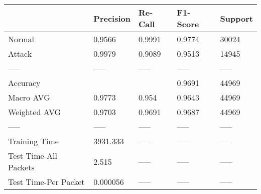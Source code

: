 \begin{tabular}{lllll}
\toprule
{} & Precision & Re-Call & F1-Score & Support \\
\midrule
Normal                &    0.9566 &  0.9991 &   0.9774 &   30024 \\
Attack                &    0.9979 &  0.9089 &   0.9513 &   14945 \\
-----                 &     ----- &   ----- &    ----- &   ----- \\
Accuracy              &           &         &   0.9691 &   44969 \\
Macro AVG             &    0.9773 &   0.954 &   0.9643 &   44969 \\
Weighted AVG          &    0.9703 &  0.9691 &   0.9687 &   44969 \\
-----                 &     ----- &   ----- &    ----- &   ----- \\
Training Time         &  3931.333 &   ----- &    ----- &   ----- \\
Test Time-All Packets &     2.515 &   ----- &    ----- &   ----- \\
Test Time-Per Packet  &  0.000056 &   ----- &    ----- &   ----- \\
\bottomrule
\end{tabular}
